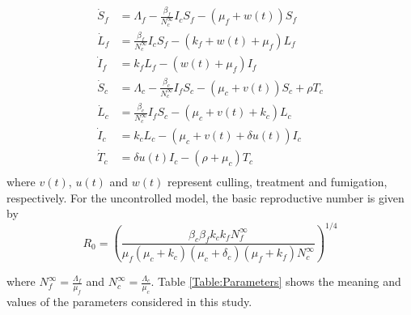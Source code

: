 \documentclass[preprint,12pt]{elsarticle}
\begin{document}
\begin{equation}\label{Eq:SIvectorhostmodelcontrol}
\begin{aligned}
    \dot{S}_f&= 
        \Lambda_f-\frac{\beta_f}{N_c^{\infty}}I_c S_f-(\mu_f+w(t))S_f
    \\
    \dot{L}_f&= 
        \frac{\beta_f}{N_c^{\infty}} I_c S_f-
        \left(
            k_f + w(t) + \mu_f
        \right) L_f
    \\
    \dot{I}_f&= 
        k_f L_f-(w(t)+\mu_f)I_f
    \\
    \dot{S}_c&= 
        \Lambda_c-\frac{\beta_c}{N_c^{\infty}}I_f S_c-
        \left(
            \mu_c + v(t)
        \right)
        S_c + \rho T_c
    \\
    \dot{L}_c&= 
        \frac{\beta_c}{N_c^{\infty}} I_f S_c - 
        \left(
            \mu_c + v(t) + 
            k_c
        \right)L_c
    \\
    \dot{I}_c&= 
        k_c L_c - 
        (\mu_c + v(t) + \delta u(t))I_c
    \\
    \dot{T}_c&= 
        \delta u(t) I_c - 
        \left(
            \rho  + \mu_c
        \right) T_c
    \\
\end{aligned}
\end{equation}
where $v(t)$, $u(t)$ and $w(t)$ represent culling, treatment and fumigation, respectively.
For the uncontrolled model, the basic reproductive number is given by
  \begin{equation}\label{eq:R0}
     R_0=\left(\frac{\beta_c\beta_f k_c k_fN_f^{\infty}}{\mu_f(\mu_c+k_c)(\mu_c+\delta_c)(\mu_f+k_f)N_c^{\infty}} \right)^{1/4}
 \end{equation}
 
\noindent where $
    \displaystyle
    N_f^{\infty}=\frac{\Lambda_f}{\mu_f}
    $ 
 and 
$
    \displaystyle
    N_c^{\infty} = \frac{\Lambda_c}{\mu_c}
$. Table \ref{Table:Parameters} shows 
 the meaning and values of the parameters considered in this study.
 
\end{document}

